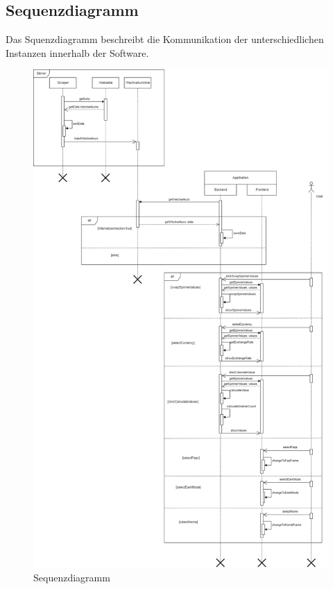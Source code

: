 \documentclass[conference]{IEEEtran}
\begin{document}
\subsection{Sequenzdiagramm}
Das Squenzdiagramm beschreibt die Kommunikation der unterschiedlichen Instanzen innerhalb der Software. \newline

\begin{figure}[h]
	\centering
	\includegraphics[width=1\linewidth, frame]{Sequenzdiagramm.drawio}
	\caption[Sequenzdiagramm]{Sequenzdiagramm}
	\label{fig:sequenzdiagramm}
\end{figure}
\end{document}
